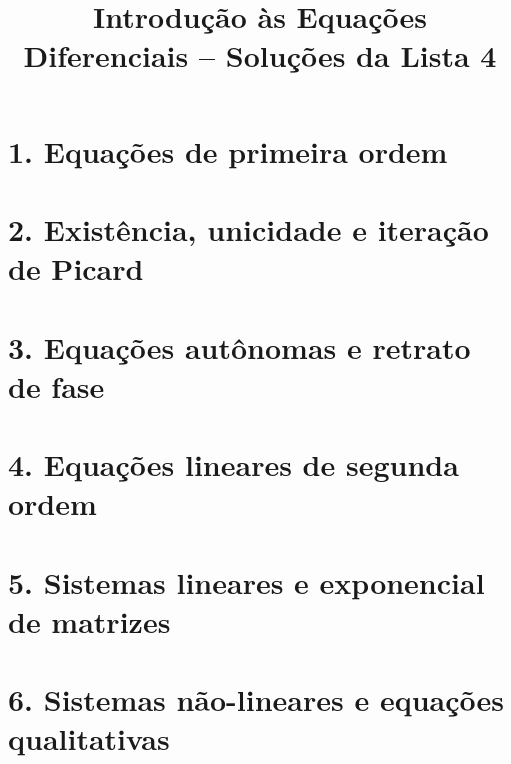 \documentclass[11pt,a4paper]{amsart}
\title{Introdução às Equações Diferenciais -- Soluções da Lista 4}
\date{}
\begin{document}
\maketitle


\section*{1. Equações de primeira ordem}


\section*{2. Existência, unicidade e iteração de Picard}


\section*{3. Equações autônomas e retrato de fase}


\section*{4. Equações lineares de segunda ordem}


\section*{5. Sistemas lineares e exponencial de matrizes}


\section*{6. Sistemas não-lineares e equações qualitativas}

\end{document}
